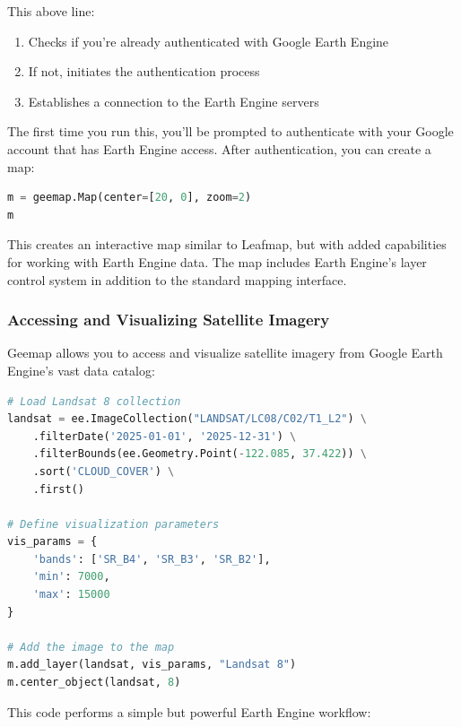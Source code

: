 This above line:

\begin{enumerate}
\item Checks if you're already authenticated with Google Earth Engine
\item If not, initiates the authentication process
\item Establishes a connection to the Earth Engine servers
\end{enumerate}

The first time you run this, you'll be prompted to authenticate with your Google account that has Earth Engine access. After authentication, you can create a map:

\begin{lstlisting}[language=Python]
m = geemap.Map(center=[20, 0], zoom=2)
m
\end{lstlisting}

This creates an interactive map similar to Leafmap, but with added capabilities for working with Earth Engine data. The map includes Earth Engine's layer control system in addition to the standard mapping interface.

\subsubsection{Accessing and Visualizing Satellite Imagery}

Geemap allows you to access and visualize satellite imagery from Google Earth Engine's vast data catalog:

\begin{lstlisting}[language=Python]
# Load Landsat 8 collection
landsat = ee.ImageCollection("LANDSAT/LC08/C02/T1_L2") \
    .filterDate('2025-01-01', '2025-12-31') \
    .filterBounds(ee.Geometry.Point(-122.085, 37.422)) \
    .sort('CLOUD_COVER') \
    .first()

# Define visualization parameters
vis_params = {
    'bands': ['SR_B4', 'SR_B3', 'SR_B2'],
    'min': 7000,
    'max': 15000
}

# Add the image to the map
m.add_layer(landsat, vis_params, "Landsat 8")
m.center_object(landsat, 8)
\end{lstlisting}

This code performs a simple but powerful Earth Engine workflow:

